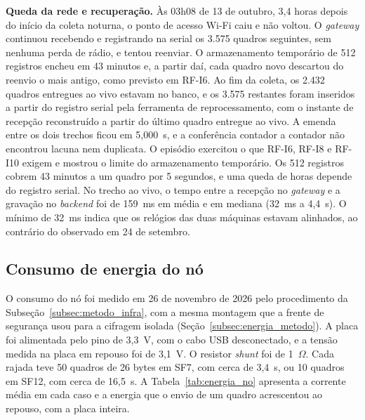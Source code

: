 \textbf{Queda da rede e recuperação.} Às 03h08 de 13 de outubro, 3,4 horas depois do início da coleta noturna, o ponto de acesso Wi-Fi caiu e não voltou. O \textit{gateway} continuou recebendo e registrando na serial os 3.575 quadros seguintes, sem nenhuma perda de rádio, e tentou reenviar. O armazenamento temporário de 512 registros encheu em 43 minutos e, a partir daí, cada quadro novo descartou do reenvio o mais antigo, como previsto em RF-I6. Ao fim da coleta, os 2.432 quadros entregues ao vivo estavam no banco, e os 3.575 restantes foram inseridos a partir do registro serial pela ferramenta de reprocessamento, com o instante de recepção reconstruído a partir do último quadro entregue ao vivo. A emenda entre os dois trechos ficou em 5,000~s, e a conferência contador a contador não encontrou lacuna nem duplicata. O episódio exercitou o que RF-I6, RF-I8 e RF-I10 exigem e mostrou o limite do armazenamento temporário. Os 512 registros cobrem 43 minutos a um quadro por 5 segundos, e uma queda de horas depende do registro serial. No trecho ao vivo, o tempo entre a recepção no \textit{gateway} e a gravação no \textit{backend} foi de 159~ms em média e em mediana (32~ms a 4,4~s). O mínimo de 32~ms indica que os relógios das duas máquinas estavam alinhados, ao contrário do observado em 24 de setembro.

\subsection{Consumo de energia do nó}
\label{subsec:energia_infra}

O consumo do nó foi medido em 26 de novembro de 2026 pelo procedimento da Subseção~\ref{subsec:metodo_infra}, com a mesma montagem que a frente de segurança usou para a cifragem isolada (Seção~\ref{subsec:energia_metodo}). A placa foi alimentada pelo pino de 3,3~V, com o cabo USB desconectado, e a tensão medida na placa em repouso foi de 3,1~V. O resistor \textit{shunt} foi de 1~$\Omega$. Cada rajada teve 50 quadros de 26 bytes em SF7, com cerca de 3,4~s, ou 10 quadros em SF12, com cerca de 16,5~s. A Tabela~\ref{tab:energia_no} apresenta a corrente média em cada caso e a energia que o envio de um quadro acrescentou ao repouso, com a placa inteira.

